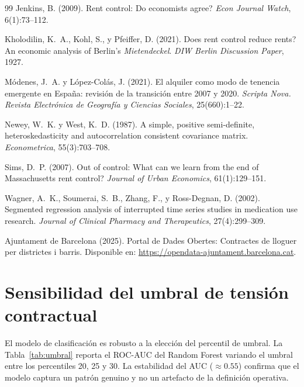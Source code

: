 \documentclass[12pt,a4paper]{article}
\begin{document}
\begin{thebibliography}{99}
Jenkins, B. (2009).
\newblock Rent control: Do economists agree?
\newblock \textit{Econ Journal Watch}, 6(1):73--112.

Kholodilin, K.~A., Kohl, S., y Pfeiffer, D. (2021).
\newblock Does rent control reduce rents? An economic analysis of Berlin's
  \textit{Mietendeckel}.
\newblock \textit{DIW Berlin Discussion Paper}, 1927.

Módenes, J.~A. y López-Colás, J. (2021).
\newblock El alquiler como modo de tenencia emergente en España: revisión de la
  transición entre 2007 y 2020.
\newblock \textit{Scripta Nova. Revista Electrónica de Geografía y Ciencias Sociales},
  25(660):1--22.

Newey, W.~K. y West, K.~D. (1987).
\newblock A simple, positive semi-definite, heteroskedasticity and autocorrelation
  consistent covariance matrix.
\newblock \textit{Econometrica}, 55(3):703--708.

Sims, D.~P. (2007).
\newblock Out of control: What can we learn from the end of Massachusetts rent control?
\newblock \textit{Journal of Urban Economics}, 61(1):129--151.

Wagner, A.~K., Soumerai, S.~B., Zhang, F., y Ross-Degnan, D. (2002).
\newblock Segmented regression analysis of interrupted time series studies in
  medication use research.
\newblock \textit{Journal of Clinical Pharmacy and Therapeutics}, 27(4):299--309.

{Ajuntament de Barcelona} (2025).
\newblock Portal de Dades Obertes: Contractes de lloguer per districtes i barris.
\newblock Disponible en: \url{https://opendata-ajuntament.barcelona.cat}.

\end{thebibliography}

\appendix

\section{Sensibilidad del umbral de tensión contractual}
\label{app:umbral}

\noindent
El modelo de clasificación es robusto a la elección del percentil de umbral. La
Tabla~\ref{tab:umbral} reporta el ROC-AUC del Random Forest variando el umbral entre
los percentiles 20, 25 y 30. La estabilidad del AUC ($\approx 0.55$) confirma que
el modelo captura un patrón genuino y no un artefacto de la definición operativa.
\end{document}
